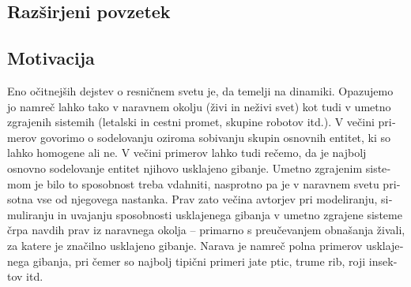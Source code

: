 \graphicspath{{img/}}









\begin{slovenian}

\chapter{Razširjeni povzetek}
\label{ch:povzetek}


\section{Motivacija}
Eno očitnejših dejstev o resničnem svetu je, da temelji na dinamiki. Opazujemo jo namreč lahko tako v naravnem okolju (živi in neživi svet) kot tudi v umetno zgrajenih sistemih (letalski in cestni promet, skupine robotov itd.). V večini primerov govorimo o sodelovanju oziroma sobivanju skupin osnovnih entitet, ki so lahko homogene ali ne. V večini primerov lahko tudi rečemo, da je najbolj osnovno sodelovanje entitet njihovo usklajeno gibanje. Umetno zgrajenim sistemom je bilo to sposobnost treba vdahniti, nasprotno pa je v naravnem svetu prisotna vse od njegovega nastanka. Prav zato večina avtorjev \cite{bonabeau:1999, braitenberg:1984,jadbabaie:2003,mataric:1995} pri modeliranju, simuliranju in uvajanju sposobnosti usklajenega gibanja v umetno zgrajene sisteme črpa navdih prav iz naravnega okolja -- primarno s preučevanjem obnašanja živali, za katere je značilno usklajeno gibanje. Narava je namreč polna primerov usklajenega gibanja, pri čemer so najbolj tipični primeri jate ptic, trume rib, roji insektov itd.


\end{slovenian}
